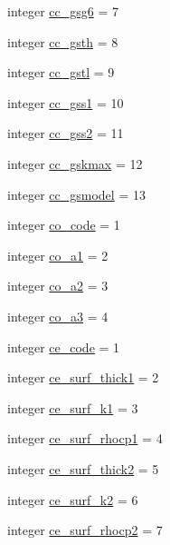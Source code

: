 \begin{DoxyCompactItemize}
integer \hyperlink{namespacecolnamesinputfiles_aeaa624e5754e91d47966ba69ffc751ae}{cc\+\_\+gsg6} = 7
\item 
integer \hyperlink{namespacecolnamesinputfiles_a18fd573ea9a56a00bf52ded29be82113}{cc\+\_\+gsth} = 8
\item 
integer \hyperlink{namespacecolnamesinputfiles_a833936ceec60218a6b417edf5c1663eb}{cc\+\_\+gstl} = 9
\item 
integer \hyperlink{namespacecolnamesinputfiles_a921bc2e1949846db1a24b63e10326fb7}{cc\+\_\+gss1} = 10
\item 
integer \hyperlink{namespacecolnamesinputfiles_ae18f5dc0d06b71aac4b8b8d19c52c3d5}{cc\+\_\+gss2} = 11
\item 
integer \hyperlink{namespacecolnamesinputfiles_ab4dc64070726bebc6213f7d260ba52c3}{cc\+\_\+gskmax} = 12
\item 
integer \hyperlink{namespacecolnamesinputfiles_a107f2511e805ced3a88b5459b10cfbd3}{cc\+\_\+gsmodel} = 13
\item 
integer \hyperlink{namespacecolnamesinputfiles_a8126a74952ead81f96e91826ab641bed}{co\+\_\+code} = 1
\item 
integer \hyperlink{namespacecolnamesinputfiles_a639ab40155d861a89b4cda9091589c11}{co\+\_\+a1} = 2
\item 
integer \hyperlink{namespacecolnamesinputfiles_a4ab300855bf4009fd3c3f2c5cd60d114}{co\+\_\+a2} = 3
\item 
integer \hyperlink{namespacecolnamesinputfiles_a67f915a871a5baf877ec2a672756f3bd}{co\+\_\+a3} = 4
\item 
integer \hyperlink{namespacecolnamesinputfiles_a799f8e8515ced689357a0f69d0e9a099}{ce\+\_\+code} = 1
\item 
integer \hyperlink{namespacecolnamesinputfiles_a153c060f5889a5409df7478a24790c57}{ce\+\_\+surf\+\_\+thick1} = 2
\item 
integer \hyperlink{namespacecolnamesinputfiles_a31aa551bebd47492d96ee41765b13b4c}{ce\+\_\+surf\+\_\+k1} = 3
\item 
integer \hyperlink{namespacecolnamesinputfiles_a9271ff7b1339135ae95c5d9f44301d27}{ce\+\_\+surf\+\_\+rhocp1} = 4
\item 
integer \hyperlink{namespacecolnamesinputfiles_adaa231ca48757a635b47d5486a5b755c}{ce\+\_\+surf\+\_\+thick2} = 5
\item 
integer \hyperlink{namespacecolnamesinputfiles_ad10ebeecf8dc5db61a34743fab8f32c7}{ce\+\_\+surf\+\_\+k2} = 6
\item 
integer \hyperlink{namespacecolnamesinputfiles_a0f5afdb74317344d39f3dd416f1248c0}{ce\+\_\+surf\+\_\+rhocp2} = 7

\end{DoxyCompactItemize}
